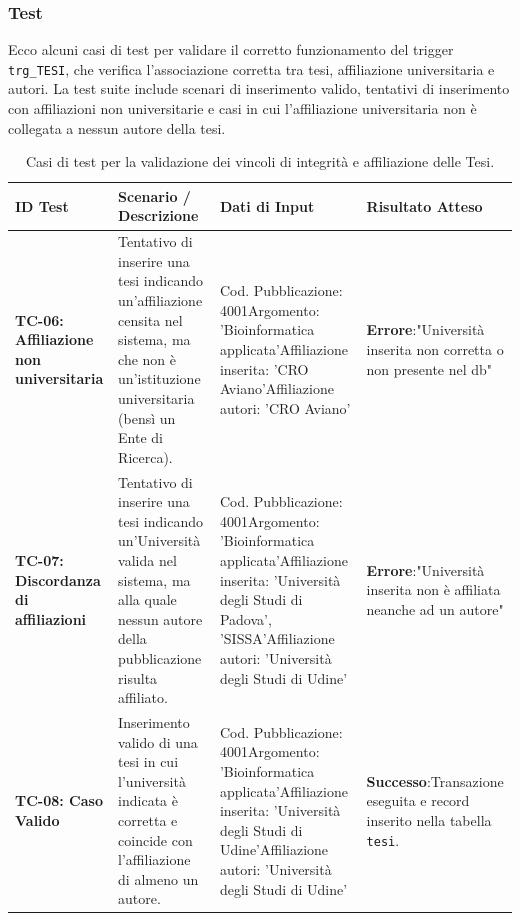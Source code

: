 \documentclass[a4paper,12pt]{article}
\begin{document}
\subsubsection*{Test}
Ecco alcuni casi di test per validare il corretto funzionamento del trigger \texttt{trg\_TESI}, che verifica l'associazione corretta tra tesi, affiliazione universitaria e autori. La test suite include scenari di inserimento valido, tentativi di inserimento con affiliazioni non universitarie e casi in cui l'affiliazione universitaria non è collegata a nessun autore della tesi.
\begin{table}[htbp]
\centering
\small
\caption{Casi di test per la validazione dei vincoli di integrità e affiliazione delle Tesi.}
\label{tab:casi_test_tesi}
\begin{tabularx}{\textwidth}{X X X X}
\toprule
\textbf{ID Test} & \textbf{Scenario / Descrizione} & \textbf{Dati di Input} & \textbf{Risultato Atteso} \\ 
\midrule
\textbf{TC-06: Affiliazione non universitaria} & 
Tentativo di inserire una tesi indicando un'affiliazione censita nel sistema, ma che non è un'istituzione universitaria (bensì un Ente di Ricerca). & 
Cod. Pubblicazione: 4001\newline Argomento: 'Bioinformatica applicata'\newline Affiliazione inserita: 'CRO Aviano'\newline Affiliazione autori: 'CRO Aviano' & 
\textbf{Errore}:\newline "Università inserita non corretta o non presente nel db" \\ 
\midrule
\textbf{TC-07: Discordanza di affiliazioni} & 
Tentativo di inserire una tesi indicando un'Università valida nel sistema, ma alla quale nessun autore della pubblicazione risulta affiliato. & 
Cod. Pubblicazione: 4001\newline Argomento: 'Bioinformatica applicata'\newline Affiliazione inserita: 'Università degli Studi di Padova', 'SISSA'\newline Affiliazione autori: 'Università degli Studi di Udine' & 
\textbf{Errore}:\newline "Università inserita non è affiliata neanche ad un autore" \\ 
\midrule
\textbf{TC-08: Caso Valido} & 
Inserimento valido di una tesi in cui l'università indicata è corretta e coincide con l'affiliazione di almeno un autore. & 
Cod. Pubblicazione: 4001\newline Argomento: 'Bioinformatica applicata'\newline Affiliazione inserita: 'Università degli Studi di Udine'\newline Affiliazione autori: 'Università degli Studi di Udine' & 
\textbf{Successo}:\newline Transazione eseguita e record inserito nella tabella \texttt{tesi}. \\ 
\bottomrule
\end{tabularx}
\end{table}
\end{document}
